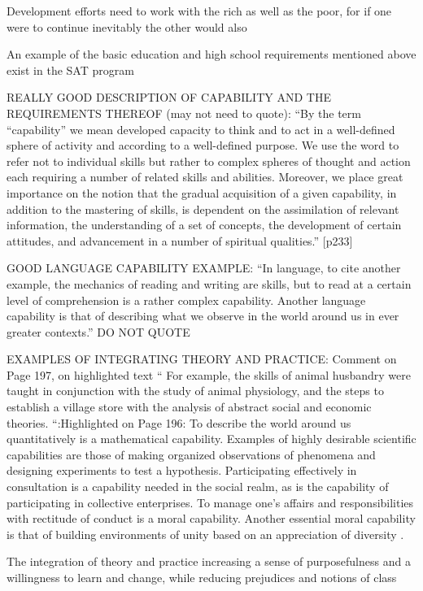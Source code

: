 Development efforts need to work with the rich as well as the poor, for if one were to continue inevitably the other would also \citep{Arbab2000} \citep{Arbab2000}


An example of the basic education and high school requirements mentioned above exist in the SAT program \citep{Arbab2000}

REALLY GOOD DESCRIPTION OF CAPABILITY AND THE REQUIREMENTS THEREOF (may not need to quote): “By the term “capability” we mean developed capacity to think and to act in a well-defined sphere of activity and according to a well-defined purpose. We use the word to refer not to individual skills but rather to complex spheres of thought and action each requiring a number of related skills and abilities. Moreover, we place great importance on the notion that the gradual acquisition of a given capability, in addition to the mastering of skills, is dependent on the assimilation of relevant information, the understanding of a set of concepts, the development of certain attitudes, and advancement in a number of spiritual qualities.” [p233]\cite{Arbab2000}

GOOD LANGUAGE CAPABILITY EXAMPLE: “In language, to cite another example, the mechanics of reading and writing are skills, but to read at a certain level of comprehension is a rather complex capability. Another language capability is that of describing what we observe in the world around us in ever greater contexts.” DO NOT QUOTE \cite{Arbab2000}

EXAMPLES OF INTEGRATING THEORY AND PRACTICE: Comment on Page 197, on highlighted text “ For example, the skills of animal husbandry were taught in conjunction with the study of animal physiology, and the steps to establish a village store with the analysis of abstract social and economic theories. “:Highlighted on Page 196: To describe the world around us quantitatively is a mathematical capability. Examples of highly desirable scientific capabilities are those of making organized observations of phenomena and designing experiments to test a hypothesis. Participating effectively in consultation is a capability needed in the social realm, as is the capability of participating in collective enterprises. To manage one's affairs and responsibilities with rectitude of conduct is a moral capability. Another essential moral capability is that of building environments of unity based on an appreciation of diversity \citep{Arbab2000}. 



The integration of theory and practice increasing a sense of purposefulness and a willingness to learn and change, while reducing prejudices and notions of class \citep{Arbab2000}

